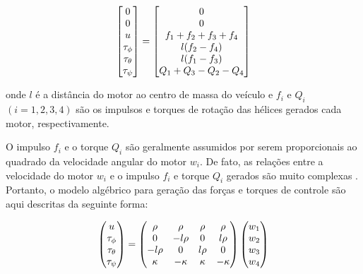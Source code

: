 \documentclass[a4paper, 12pt]{article}
\begin{document}
\begin{equation}
\centering
\begin{bmatrix} 
    0 \\ 0 \\ u \\ \tau _{ \phi  } \\ \tau _{ \theta  } \\ \tau _{ \psi  } 
\end{bmatrix}   =
\begin{bmatrix} 0 \\ 0 \\ { { f }_{ 1 }+{ f }_{ 2 }+{ f }_{ 3 }+{ f }_{ 4 } } \\ l({ f }_{ 2 }-{ f }_{ 4 }) \\ l({ f }_{ 1 }-{ f }_{ 3 }) \\ Q_1 + Q_3 - Q_2 - Q_4
 \end{bmatrix}
\label{eq:forca1}
\end{equation}

\noindent onde $l$ é a distância do motor ao centro de massa do veículo e $f_i$ e $Q_i$ $(i=1,2,3,4)$  são os impulsos e torques de rotação das hélices gerados cada motor, respectivamente. 

O impulso $f_i$ e o torque $Q_i$ são geralmente assumidos por serem proporcionais ao quadrado da velocidade angular do motor $w_i$. De fato, as relações entre a velocidade do motor $w_i$ e o impulso $f_i$ e torque $Q_i$ gerados são  muito complexas \cite{McCormick1995}\cite{Prouty1995}. Portanto, o modelo algébrico para geração das forças e torques de controle são aqui descritas da seguinte forma: 

\begin{equation}
\centering
\begin{pmatrix} 
	u \\ \tau _{ \phi  } \\ \tau _{ \theta  } \\ \tau _{ \psi  } 
\end{pmatrix}=
\begin{pmatrix}
	\rho  & \rho  & \rho  & \rho  \\ 
	0 & -l\rho  & 0 & l\rho  \\ 
	-l\rho  & 0 & l\rho  & 0 \\ 
	\kappa  & -\kappa  & \kappa  & -\kappa 
\end{pmatrix}
\begin{pmatrix}
	{ w }_{ 1 } \\ { w }_{ 2 } \\{ w }_{ 3 }\\ { w }_{ 4 }
\end{pmatrix}
\label{eq:forca2}
\end{equation}
\end{document}
